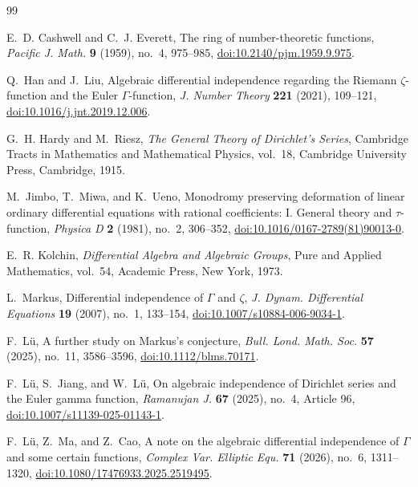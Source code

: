 \documentclass[11pt]{article}
\numberwithin{equation}{section}
\theoremstyle{definition}
\theoremstyle{remark}
\begin{document}
\begingroup
\small
\begin{thebibliography}{99}

E.~D. Cashwell and C.~J. Everett,
The ring of number-theoretic functions,
\emph{Pacific J. Math.} \textbf{9} (1959), no.~4, 975--985,
\href{https://doi.org/10.2140/pjm.1959.9.975}{doi:10.2140/pjm.1959.9.975}.

Q.~Han and J.~Liu,
Algebraic differential independence regarding the Riemann $\zeta$-function and the Euler
$\Gamma$-function,
\emph{J. Number Theory} \textbf{221} (2021), 109--121,
\href{https://doi.org/10.1016/j.jnt.2019.12.006}{doi:10.1016/j.jnt.2019.12.006}.

G.~H. Hardy and M.~Riesz,
\emph{The General Theory of Dirichlet's Series},
Cambridge Tracts in Mathematics and Mathematical Physics, vol.~18,
Cambridge University Press, Cambridge, 1915.

M.~Jimbo, T.~Miwa, and K.~Ueno,
Monodromy preserving deformation of linear ordinary differential equations with rational
coefficients: I. General theory and $\tau$-function,
\emph{Physica D} \textbf{2} (1981), no.~2, 306--352,
\href{https://doi.org/10.1016/0167-2789(81)90013-0}{doi:10.1016/0167-2789(81)90013-0}.

E.~R. Kolchin,
\emph{Differential Algebra and Algebraic Groups},
Pure and Applied Mathematics, vol.~54, Academic Press, New York, 1973.

L.~Markus,
Differential independence of $\Gamma$ and $\zeta$,
\emph{J. Dynam. Differential Equations} \textbf{19} (2007), no.~1, 133--154,
\href{https://doi.org/10.1007/s10884-006-9034-1}{doi:10.1007/s10884-006-9034-1}.

F.~L\"u,
A further study on Markus's conjecture,
\emph{Bull. Lond. Math. Soc.} \textbf{57} (2025), no.~11, 3586--3596,
\href{https://doi.org/10.1112/blms.70171}{doi:10.1112/blms.70171}.

F.~L\"u, S.~Jiang, and W.~L\"u,
On algebraic independence of Dirichlet series and the Euler gamma function,
\emph{Ramanujan J.} \textbf{67} (2025), no.~4, Article 96,
\href{https://doi.org/10.1007/s11139-025-01143-1}{doi:10.1007/s11139-025-01143-1}.

F.~L\"u, Z.~Ma, and Z.~Cao,
A note on the algebraic differential independence of $\Gamma$ and some certain functions,
\emph{Complex Var. Elliptic Equ.} \textbf{71} (2026), no.~6, 1311--1320,
\href{https://doi.org/10.1080/17476933.2025.2519495}
  {doi:10.1080/17476933.2025.2519495}.


\end{thebibliography}
\end{document}
